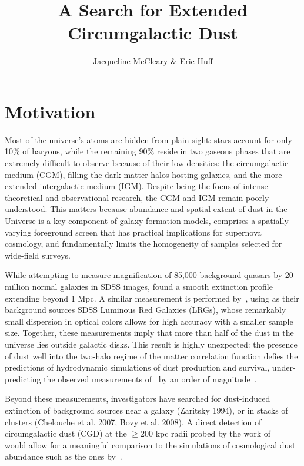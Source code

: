 \documentclass[11pt, oneside]{article}   	%
\title{A Search for Extended Circumgalactic Dust}
\author{Jacqueline McCleary \& Eric Huff}
\begin{document}
\maketitle
\section{Motivation\label{sec:intro}}
Most of the universe's atoms are hidden from plain sight: stars account for only 10\% of baryons, while the remaining 90\% reside in two gaseous phases that are extremely difficult to observe because of their low densities: the circumgalactic medium (CGM), filling the dark matter halos hosting galaxies, and the more extended intergalactic medium (IGM).  Despite being the focus of intense theoretical and observational research, the CGM and IGM remain poorly understood. This matters because abundance and spatial extent of dust in the Universe is a key component of galaxy formation models, comprises a spatially varying foreground screen that has practical implications for supernova cosmology, and fundamentally limits the homogeneity of samples selected for wide-field surveys. 

While attempting to measure magnification of 85,000 background quasars by 20 million normal galaxies in SDSS images, \cite{menard2010measuring} found a smooth extinction profile extending beyond 1 Mpc. A similar measurement is performed by~\cite{peek2015dust}, using as their background sources SDSS Luminous Red Galaxies (LRGs), whose remarkably small dispersion in optical colors allows for high accuracy with a smaller sample size. Together, these measurements imply that more than half of the dust in the universe lies outside galactic disks. This result is highly unexpected: the presence of dust well into the two-halo regime of the matter correlation function defies the predictions of hydrodynamic simulations of dust production and survival, under-predicting the observed measurements of~\cite{menard2010measuring, peek2015dust} by an order of magnitude~\cite{mckinnon2016dust, vogelsberger2017uniformity}. 

Beyond these measurements, investigators have searched for dust-induced extinction of background sources near a galaxy (Zaritsky 1994), or in stacks of clusters (Chelouche et al. 2007, Bovy et al. 2008). A direct detection of circumgalactic dust (CGD) at the $\ge 200$ kpc radii probed by the work of ~\cite{menard2010measuring, peek2015dust} would allow for a meaningful comparison to the simulations of cosmological dust abundance such as the ones by~\cite{mckinnon2016dust, vogelsberger2017uniformity}. 
\end{document}
